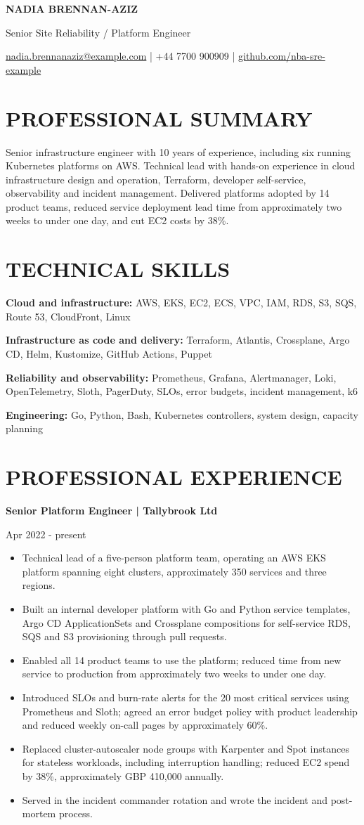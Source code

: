 \documentclass[11pt,a4paper]{article}
\newcommand{\cvsection}[1]{\section*{#1}}
\newcommand{\cvitem}[2]{\noindent\textbf{#1}\par\noindent #2\par}
\begin{document}
{\LARGE\bfseries\color{primarycolor} NADIA BRENNAN-AZIZ}\par
{\large\color{accentcolor} Senior Site Reliability / Platform Engineer}\par
{\small \href{mailto:nadia.brennanaziz@example.com}{nadia.brennanaziz@example.com} | +44 7700 900909 | \href{https://github.com/nba-sre-example}{github.com/nba-sre-example}}\par

\cvsection{PROFESSIONAL SUMMARY}
Senior infrastructure engineer with 10 years of experience, including six running Kubernetes platforms on AWS. Technical lead with hands-on experience in cloud infrastructure design and operation, Terraform, developer self-service, observability and incident management. Delivered platforms adopted by 14 product teams, reduced service deployment lead time from approximately two weeks to under one day, and cut EC2 costs by 38\%.

\cvsection{TECHNICAL SKILLS}
\textbf{Cloud and infrastructure:} AWS, EKS, EC2, ECS, VPC, IAM, RDS, S3, SQS, Route 53, CloudFront, Linux\par
\textbf{Infrastructure as code and delivery:} Terraform, Atlantis, Crossplane, Argo CD, Helm, Kustomize, GitHub Actions, Puppet\par
\textbf{Reliability and observability:} Prometheus, Grafana, Alertmanager, Loki, OpenTelemetry, Sloth, PagerDuty, SLOs, error budgets, incident management, k6\par
\textbf{Engineering:} Go, Python, Bash, Kubernetes controllers, system design, capacity planning

\cvsection{PROFESSIONAL EXPERIENCE}
\cvitem{Senior Platform Engineer | Tallybrook Ltd}{Apr 2022 - present}
\begin{itemize}
\item Technical lead of a five-person platform team, operating an AWS EKS platform spanning eight clusters, approximately 350 services and three regions.
\item Built an internal developer platform with Go and Python service templates, Argo CD ApplicationSets and Crossplane compositions for self-service RDS, SQS and S3 provisioning through pull requests.
\item Enabled all 14 product teams to use the platform; reduced time from new service to production from approximately two weeks to under one day.
\item Introduced SLOs and burn-rate alerts for the 20 most critical services using Prometheus and Sloth; agreed an error budget policy with product leadership and reduced weekly on-call pages by approximately 60\%.
\item Replaced cluster-autoscaler node groups with Karpenter and Spot instances for stateless workloads, including interruption handling; reduced EC2 spend by 38\%, approximately GBP 410,000 annually.
\item Served in the incident commander rotation and wrote the incident and post-mortem process.
\end{itemize}
\end{document}

